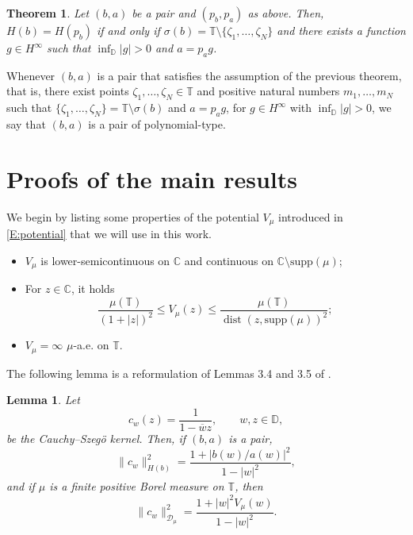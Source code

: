 \documentclass[12pt]{amsart}
\newtheorem{theorem2}{Theorem}
\newtheorem{lemma}[theorem]{Lemma}
\theoremstyle{definition}
\theoremstyle{remark}
\theoremstyle{remark}
\begin{document}
\begin{theorem2} \label{T:mainpolynomial}
    Let $(b,a)$ be a pair and $(p_b,p_a)$ as above. Then, $H(b)=H(p_b)$ if and only if $\sigma(b)=\mathbb{T}\setminus \{\zeta_1,\ldots,\zeta_N\}$ and there exists a function $g\in H^\infty$ such that $\inf_{\mathbb{D}}|g|>0$ and $a=p_a g$.
\end{theorem2}

Whenever $(b,a)$ is a pair that satisfies the assumption of the previous theorem, that is, there exist points $\zeta_1,\ldots,\zeta_N\in\mathbb{T}$ and positive natural numbers $m_1,\ldots,m_N$ such that $\{\zeta_1,\ldots,\zeta_N\}=\mathbb{T}\setminus\sigma(b)$ and $a=p_ag$, for $g\in H^\infty$ with $\inf_\mathbb{D}|g|>0$, we say that $(b,a)$ is a pair of polynomial-type. 




\section{Proofs of the main results} \label{S:results}
We begin by listing some properties of the potential $V_\mu$ introduced in \eqref{E:potential} that we will use in this work. 
    \begin{itemize}
        \item $V_\mu$ is lower-semicontinuous on $\mathbb{C}$ and continuous on $\mathbb{C}\setminus\text{supp}(\mu)$;
        \item For $z\in\mathbb{C}$, it holds
        \begin{equation*}
            \frac{\mu(\mathbb{T})}{(1+|z|)^2} \leq V_\mu(z) \leq \frac{\mu(\mathbb{T})}{\operatorname{dist}(z,\text{supp}(\mu))^2};
        \end{equation*}
        \item $V_\mu = \infty$ $\mu$-a.e. on $\mathbb{T}$.
    \end{itemize}

The following lemma is a reformulation of Lemmas 3.4 and 3.5 of \cite{costara2013}.
\begin{lemma} \label{L:normcw}
    Let 
    \[c_w(z)= \frac{1}{1-\overline{w}z}, \qquad w,z\in\mathbb{D},\]
    be the Cauchy--Szeg\"o kernel. Then, if $(b,a)$ is a pair,
    \begin{equation}
        \|c_w\|_{H(b)}^2 = \frac{1+|b(w)/a(w)|^2}{1-|w|^2},
    \end{equation}
    and if $\mu$ is a finite positive Borel measure on $\mathbb T$, then
    \begin{equation}
        \|c_w\|_{\mathcal{D}_\mu}^2 =\frac{1+|w|^2V_\mu(w)}{1-|w|^2}.
    \end{equation}
\end{lemma}
\end{document}
